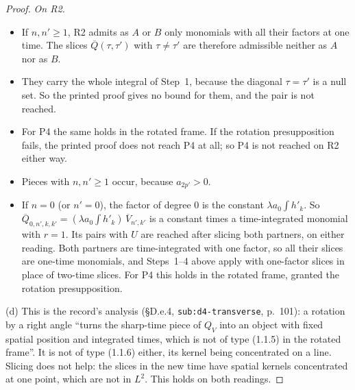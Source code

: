 \documentclass[11pt,a4paper]{article}
\newcommand{\Vb}{\overline V}                 %
\theoremstyle{plain}
\theoremstyle{definition}
\begin{document}
\begin{proof}
\emph{On R2.}
\begin{itemize}
\item If $n,n'\ge1$, R2 admits as $A$ or $B$ only monomials with all their factors at one time.
The slices $\overline Q(\tau,\tau')$ with $\tau\ne\tau'$ are therefore admissible neither as $A$
nor as $B$.
\item They carry the whole integral of Step~1, because the diagonal $\tau=\tau'$ is a null set.
So the printed proof gives no bound for them, and the pair is not reached.
\item For P4 the same holds in the rotated frame.  If the rotation presupposition fails, the
printed proof does not reach P4 at all; so P4 is not reached on R2 either way.
\item Pieces with $n,n'\ge1$ occur, because $a_{2p'}>0$.
\item If $n=0$ (or $n'=0$), the factor of degree $0$ is the constant $\lambda a_0\int h'_k$.  So
$\overline Q_{0,n',k,k'}=(\lambda a_0\int h'_k)\,\Vb_{n',k'}$ is a constant times a
time-integrated monomial with $r=1$.  Its pairs with $U$ are reached after slicing both
partners, on either reading.  Both partners are time-integrated with one factor, so all their
slices are one-time monomials, and Steps~1--4 above apply with one-factor slices in place of
two-time slices.  For P4 this holds in the rotated frame, granted the rotation
presupposition.
\end{itemize}

(d) This is the record's analysis (\S D.e.4, \texttt{sub:d4-transverse}, p.~101): a rotation by a
right angle ``turns the sharp-time piece of $Q_V$ into an object with fixed spatial position and
integrated times, which is not of type (1.1.5) in the rotated frame''.  It is not of type (1.1.6)
either, its kernel being concentrated on a line.  Slicing does not help: the slices in the new time
have spatial kernels concentrated at one point, which are not in $L^2$.  This holds on both
readings.
\end{proof}
\end{document}
